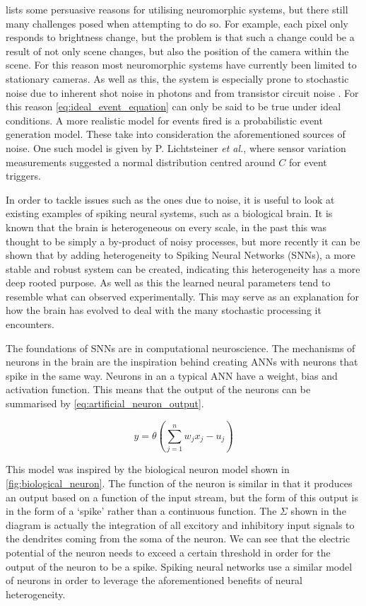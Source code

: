  lists some persuasive reasons for utilising neuromorphic systems, but there still many challenges posed when attempting to do so. For example, each pixel only responds to brightness change, but the problem is that such a change could be a result of not only scene changes, but also the position of the camera within the scene. For this reason most neuromorphic systems have currently been limited to stationary cameras. As well as this, the system is especially prone to stochastic noise due to inherent shot noise in photons and from transistor circuit noise \cite{EventBasedVisionASurvery}. For this reason \autoref{eq:ideal_event_equation} can only be said to be true under ideal conditions. A more realistic model for events fired is a probabilistic event generation model. These take into consideration the aforementioned sources of noise. One such model is given by P. Lichtsteiner \textit{et al.}\cite{NonIdealEventCamera}, where sensor variation measurements suggested a normal distribution centred around $ C $ for event triggers.

In order to tackle issues such as the ones due to noise, it is useful to look at existing examples of spiking neural systems, such as a biological brain. It is known that the brain is heterogeneous on every scale, in the past this was thought to be simply a by-product of noisy processes, but more recently it can be shown that by adding heterogeneity to Spiking Neural Networks (SNNs), a more stable and robust system can be created\cite{NeuralHetroPromRobLearn}, indicating this heterogeneity has a more deep rooted purpose. As well as this the learned neural parameters tend to resemble what can observed experimentally. This may serve as an explanation for how the brain has evolved to deal with the many stochastic processing it encounters.

The foundations of SNNs are in computational neuroscience. The mechanisms of neurons in the brain are the inspiration behind creating ANNs with neurons that spike in the same way. Neurons in an a typical ANN have a weight, bias and activation function. This means that the output of the neurons can be summarised by \autoref{eq:artificial_neuron_output}.

\begin{equation}
      y = \theta(\sum^n_{j=1}w_jx_j-u_j)
      \label{eq:artificial_neuron_output}
\end{equation}

This model was inspired by the biological neuron model shown in \autoref{fig:biological_neuron}. The function of the neuron is similar in that it produces an output based on a function of the input stream, but the form of this output is in the form of a `spike' rather than a continuous function. The $ \Sigma $ shown in the diagram is actually the integration of all excitory and inhibitory input signals to the dendrites coming from the soma of the neuron. We can see that the electric potential of the neuron needs to exceed a certain threshold in order for the output of the neuron to be a spike. Spiking neural networks use a similar model of neurons in order to leverage the aforementioned benefits of neural heterogeneity.

